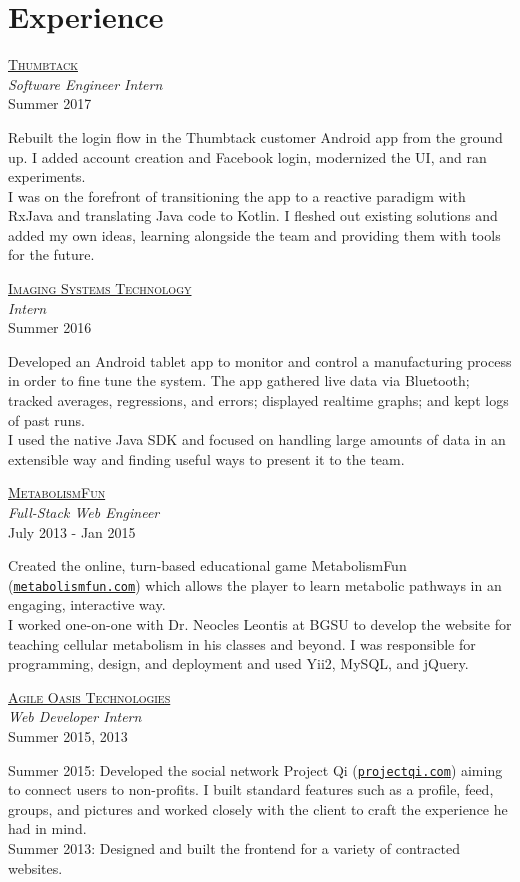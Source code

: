 \documentclass[letterpaper,10pt]{article}
\newcommand{\lb}{\vspace{3pt} \\}
\newenvironment{resumecols}[4]
{
    \vspace{.08cm}
    \begin{minipage}[t]{.22\linewidth}
        \begin{flushright}
            \href{#2}{\textsc{#1}} \\
            \small{\textit{#3}} \\
            \small{#4}
        \end{flushright}
    \end{minipage}
    \hspace{.005\linewidth}
    \begin{minipage}[t]{.7625\linewidth}
}
{
    \end{minipage}
    \vspace{.08cm}
}
\begin{document}
\section{Experience}

\begin{resumecols}{Thumbtack}{https://www.thumbtack.com/about}{Software Engineer Intern}{Summer 2017}
    Rebuilt the login flow in the Thumbtack customer Android app from the ground up. I added account creation and Facebook login, modernized the UI, and ran experiments.
    \lb
    I was on the forefront of transitioning the app to a reactive paradigm with RxJava and translating Java code to Kotlin. I fleshed out existing solutions and added my own ideas, learning alongside the team and providing them with tools for the future.
\end{resumecols}

\begin{resumecols}{Imaging Systems Technology}{http://www.teamist.com}{Intern}{Summer 2016}
    Developed an Android tablet app to monitor and control a manufacturing process in order to fine tune the system. The app gathered live data via Bluetooth; tracked averages, regressions, and errors; displayed realtime graphs; and kept logs of past runs.
    \lb
    I used the native Java SDK and focused on handling large amounts of data in an extensible way and finding useful ways to present it to the team.
\end{resumecols}

\begin{resumecols}{MetabolismFun}{http://metabolismfun.com}{Full-Stack Web Engineer}{July 2013 - Jan 2015}
    Created the online, turn-based educational game MetabolismFun (\href{http://metabolismfun.com}{\texttt{metabolismfun.com}}) which allows the player to learn metabolic pathways in an engaging, interactive way.
    \lb
    I worked one-on-one with Dr. Neocles Leontis at BGSU to develop the website for teaching cellular metabolism in his classes and beyond. I was responsible for programming, design, and deployment and used Yii2, MySQL, and jQuery.
\end{resumecols}

\begin{resumecols}{Agile Oasis Technologies}{http://agileoasis.com}{Web Developer Intern}{Summer 2015, 2013}
    Summer 2015: Developed the social network Project Qi (\href{http://www.projectqi.com}{\texttt{projectqi.com}}) aiming to connect users to non-profits. I built standard features such as a profile, feed, groups, and pictures and worked closely with the client to craft the experience he had in mind.
    \lb
    Summer 2013: Designed and built the frontend for a variety of contracted websites.
\end{resumecols}
\end{document}

